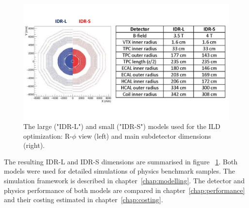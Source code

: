 \begin{figure}[t!]
\centering
\includegraphics[width=1.0\hsize]{ILD/fig/ILD_small-large.jpg}
\caption{The large ("IDR-L") and small ("IDR-S") models used for the ILD optimization: R-$\phi$ view (left) and main subdetector dimensions (right).}
\label{fig:ILD:sizes}
\end{figure}

The resulting IDR-L and IDR-S dimensions are summarised in figure ~\ref{fig:ILD:sizes}. Both models were used for detailed simulations of physics benchmark samples. The simulation framework is described in chapter~\ref{chap:modelling}. The detector and physics performance of both models are compared in chapter~\ref{chap:performance} and their costing estimated in chapter~\ref{chap:costing}. \vfill


	